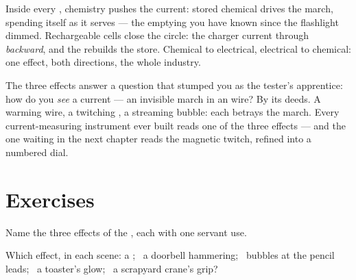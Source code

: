 \begin{example}\label{ex:g8:electric-current-effects:battery}
Inside every , chemistry pushes the current: stored
chemical  drives the march, spending itself as it serves
--- the emptying you have known since the flashlight dimmed.
Rechargeable cells close the circle: the charger  current
through \emph{backward}, and the  rebuilds the
store. Chemical to electrical, electrical to chemical: one
effect, both directions, the whole  industry.
\end{example}

\begin{remark}\label{rem:g8:electric-current-effects:detect}
The three effects answer a question that stumped you as the
tester's apprentice: how do you \emph{see} a current --- an
invisible march in an  wire? By its deeds. A warming
wire, a twitching , a streaming bubble: each betrays the
march. Every current-measuring instrument ever built reads one
of the three effects --- and the one waiting in the next
chapter reads the magnetic twitch, refined into a numbered
dial.
\end{remark}

\section{Exercises}

\begin{exercise}[$\star$]\label{exo:g8:electric-current-effects:1}
Name the three effects of the , each with one
servant use.
\end{exercise}

\begin{exercise}[$\star$]\label{exo:g8:electric-current-effects:2}
Which effect, in each scene: a  ; \ a doorbell
hammering; \ bubbles at the pencil leads; \ a toaster's glow;
\ a scrapyard crane's grip?
\end{exercise}

